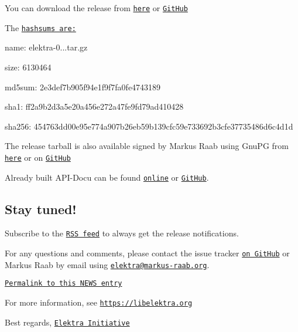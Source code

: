 You can download the release from \href{https://www.libelektra.org/ftp/elektra/releases/elektra-0.8.24.tar.gz}{\tt here} or \href{https://github.com/ElektraInitiative/ftp/blob/master/releases/elektra-0.8.24.tar.gz?raw=true}{\tt Git\+Hub}

The \href{https://github.com/ElektraInitiative/ftp/blob/master/releases/elektra-0.8.24.tar.gz.hashsum?raw=true}{\tt hashsums are\+:}


\begin{DoxyItemize}
\item name\+: elektra-\/0...\+tar.\+gz
\item size\+: 6130464
\item md5sum\+: 2e3def7b905f94e1f9f7fa0fe4743189
\item sha1\+: ff2a9b2d3a5e20a456e272a47fe9fd79ad410428
\item sha256\+: 454763dd00e95e774a907b26eb59b139cfc59e733692b3cfe37735486d6c4d1d
\end{DoxyItemize}

The release tarball is also available signed by Markus Raab using Gnu\+PG from \href{https://www.libelektra.org/ftp/elektra/releases/elektra-0.8.24.tar.gz.gpg}{\tt here} or on \href{https://github.com/ElektraInitiative/ftp/blob/master/releases//elektra-0.8.24.tar.gz.gpg?raw=true}{\tt Git\+Hub}

Already built A\+P\+I-\/\+Docu can be found \href{https://doc.libelektra.org/api/0.8.24/html/}{\tt online} or \href{https://github.com/ElektraInitiative/doc/tree/master/api/0.8.24}{\tt Git\+Hub}.

\subsection*{Stay tuned!}

Subscribe to the \href{https://www.libelektra.org/news/feed.rss}{\tt R\+SS feed} to always get the release notifications.

For any questions and comments, please contact the issue tracker \href{http://issues.libelektra.org}{\tt on Git\+Hub} or Markus Raab by email using \href{mailto:elektra@markus-raab.org}{\tt elektra@markus-\/raab.\+org}.

\href{https://www.libelektra.org/news/0.8.24-release}{\tt Permalink to this N\+E\+WS entry}

For more information, see \href{https://libelektra.org}{\tt https\+://libelektra.\+org}

Best regards, \href{https://www.libelektra.org/developers/authors}{\tt Elektra Initiative} 